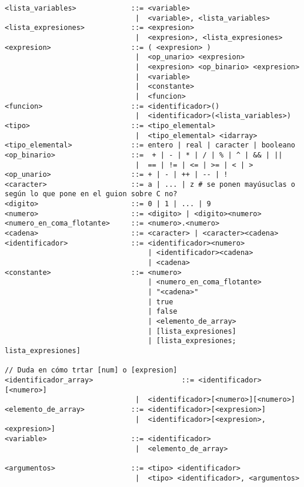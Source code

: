 \begin{verbatim}
<lista_variables>             ::= <variable>
                               |  <variable>, <lista_variables>
<lista_expresiones>           ::= <expresion>
                               |  <expresion>, <lista_expresiones>
<expresion>                   ::= ( <expresion> )
                               |  <op_unario> <expresion>
                               |  <expresion> <op_binario> <expresion>
                               |  <variable>
                               |  <constante>
                               |  <funcion>
<funcion>                     ::= <identificador>()
                               |  <identificador>(<lista_variables>)
<tipo>                        ::= <tipo_elemental>
                               |  <tipo_elemental> <idarray>
<tipo_elemental>              ::= entero | real | caracter | booleano
<op_binario>                  ::=  + | - | * | / | % | ^ | && | || 
                               |  == | != | <= | >= | < | >
<op_unario>                   ::= + | - | ++ | -- | !
<caracter>                    ::= a | ... | z # se ponen mayúsuclas o según lo que pone en el guion sobre C no?
<digito>                      ::= 0 | 1 | ... | 9
<numero>                      ::= <digito> | <digito><numero>
<numero_en_coma_flotante>     ::= <numero>.<numero>
<cadena>                      ::= <caracter> | <caracter><cadena>
<identificador>               ::= <identificador><numero>
                                  | <identificador><cadena>
                                  | <cadena>
<constante>                   ::= <numero>
                                  | <numero_en_coma_flotante>
                                  | "<cadena>"
                                  | true
                                  | false
                                  | <elemento_de_array>
                                  | [lista_expresiones]
                                  | [lista_expresiones; lista_expresiones]

// Duda en cómo trtar [num] o [expresion]
<identificador_array>                     ::= <identificador>[<numero>] 
                               |  <identificador>[<numero>][<numero>]
<elemento_de_array>           ::= <identificador>[<expresion>]
                               |  <identificador>[<expresion>, <expresion>]
<variable>                    ::= <identificador>
                               |  <elemento_de_array>

<argumentos>                  ::= <tipo> <identificador>
                               |  <tipo> <identificador>, <argumentos>

\end{verbatim}


